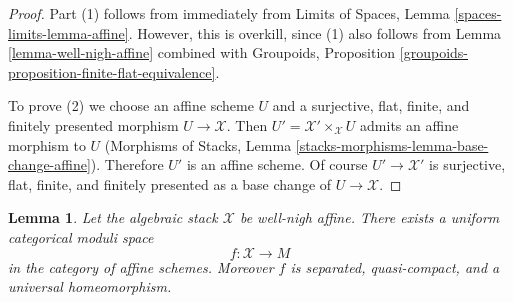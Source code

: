 \documentclass{stacks-project}
\theoremstyle{plain}
\newtheorem{lemma}[subsection]{Lemma}
\theoremstyle{definition}
\theoremstyle{remark}
\numberwithin{equation}{subsection}
\begin{document}
\begin{proof}
Part (1) follows from immediately from
Limits of Spaces, Lemma \ref{spaces-limits-lemma-affine}.
However, this is overkill, since (1) also follows from
Lemma \ref{lemma-well-nigh-affine} combined with
Groupoids, Proposition
\ref{groupoids-proposition-finite-flat-equivalence}.

\medskip\noindent
To prove (2) we choose an affine scheme $U$ and a
surjective, flat, finite, and finitely presented morphism $U \to \mathcal{X}$.
Then $U' = \mathcal{X}' \times_\mathcal{X} U$ admits an affine
morphism to $U$ (Morphisms of Stacks, Lemma
\ref{stacks-morphisms-lemma-base-change-affine}).
Therefore $U'$ is an affine scheme. Of course
$U' \to \mathcal{X}'$ is surjective, flat, finite, and finitely presented
as a base change of $U \to \mathcal{X}$.
\end{proof}

\begin{lemma}
\label{lemma-well-nigh-affine-moduli-space}
Let the algebraic stack $\mathcal{X}$ be well-nigh affine. There exists
a uniform categorical moduli space
$$
f : \mathcal{X} \longrightarrow M
$$
in the category of affine schemes. Moreover
$f$ is separated, quasi-compact, and a universal homeomorphism.
\end{lemma}
\end{document}
